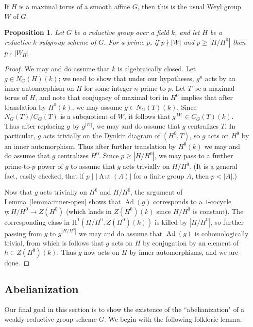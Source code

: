 \documentclass[11pt, letterpaper,english]{amsart}
\theoremstyle{plain}
\newtheorem{prop}[lem]{Proposition}
\theoremstyle{definition}
\numberwithin{equation}{section}
\numberwithin{lem}{section}
\DeclareMathOperator{\Aut}{Aut}
\DeclareMathOperator{\Ad}{Ad}
\begin{document}
If $H$ is a maximal torus of a smooth affine $G$, then this is the usual Weyl group $W$ of $G$.

\begin{prop} \label{prop:p not divide weyl}
Let $G$ be a reductive group over a field $k$, and let $H$ be a reductive $k$-subgroup scheme of $G$. For a prime $p$, if $p \nmid |W|$ and $p \geq |H/H^0|$ then $p \nmid |W_H|$.
\end{prop}

\begin{proof}
We may and do assume that $k$ is algebraically closed. Let $g \in N_G(H)(k)$; we need to show that under our hypotheses, $g^n$ acts by an inner automorphism on $H$ for some integer $n$ prime to $p$. Let $T$ be a maximal torus of $H$, and note that conjugacy of maximal tori in $H^0$ implies that after translation by $H^0(k)$, we may assume $g \in N_G(T)(k)$. Since $N_G(T)/C_G(T)$ is a subquotient of $W$, it follows that $g^{|W|} \in C_G(T)(k)$. Thus after replacing $g$ by $g^{|W|}$, we may and do assume that $g$ centralizes $T$. In particular, $g$ acts trivially on the Dynkin diagram of $(H^0, T)$, so $g$ acts on $H^0$ by an inner automorphism. Thus after further translation by $H^0(k)$ we may and do assume that $g$ centralizes $H^0$. Since $p \geq |H/H^0|$, we may pass to a further prime-to-$p$ power of $g$ to assume that $g$ acts trivially on $H/H^0$. (It is a general fact, easily checked, that if $p \mid |\Aut(A)|$ for a finite group $A$, then $p < |A|$.) 

Now that $g$ acts trivially on $H^0$ and $H/H^0$, the argument of Lemma~\ref{lemma:inner-open} shows that $\Ad(g)$ corresponds to a $1$-cocycle $\eta: H/H^0 \to Z(H^0)$ (which lands in $Z(H^0)(k)$ since $H/H^0$ is constant). The corresponding class in $\mathrm{H}^1(H/H^0, Z(H^0)(k))$ is killed by $|H/H^0|$, so further passing from $g$ to $g^{|H/H^0|}$ we may and do assume that $\Ad(g)$ is cohomologically trivial, from which is follows that $g$ acts on $H$ by conjugation by an element of $h \in Z(H^0)(k)$. Thus $g$ now acts on $H$ by inner automorphisms, and we are done.
\end{proof}


\subsection{Abelianization}

Our final goal in this section is to show the existence of the ``abelianization" of a weakly reductive group scheme $G$. We begin with the following folkloric lemma.
\end{document}
